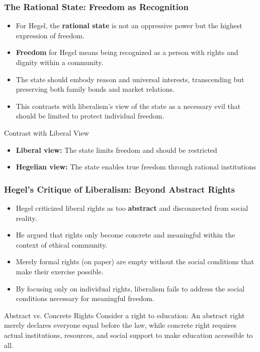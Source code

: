\documentclass{beamer}
\begin{document}
\begin{frame}
\frametitle{The Rational State: Freedom as Recognition}
\begin{itemize}
    \item For Hegel, the \textbf{rational state} is not an oppressive power but the highest expression of freedom.
    \item \textbf{Freedom} for Hegel means being recognized as a person with rights and dignity within a community.
    \item The state should embody reason and universal interests, transcending but preserving both family bonds and market relations.
    \item This contrasts with liberalism's view of the state as a necessary evil that should be limited to protect individual freedom.
\end{itemize}

\begin{exampleblock}{Contrast with Liberal View}
\begin{itemize}
    \item \textbf{Liberal view:} The state limits freedom and should be restricted
    \item \textbf{Hegelian view:} The state enables true freedom through rational institutions
\end{itemize}
\end{exampleblock}
\end{frame}

\begin{frame}
\frametitle{Hegel's Critique of Liberalism: Beyond Abstract Rights}
\begin{itemize}
    \item Hegel criticized liberal rights as too \textbf{abstract} and disconnected from social reality.
    \item He argued that rights only become concrete and meaningful within the context of ethical community.
    \item Merely formal rights (on paper) are empty without the social conditions that make their exercise possible.
    \item By focusing only on individual rights, liberalism fails to address the social conditions necessary for meaningful freedom.
\end{itemize}

\begin{block}{Abstract vs. Concrete Rights}
Consider a right to education: An abstract right merely declares everyone equal before the law, while concrete right requires actual institutions, resources, and social support to make education accessible to all.
\end{block}
\end{frame}
\end{document}
